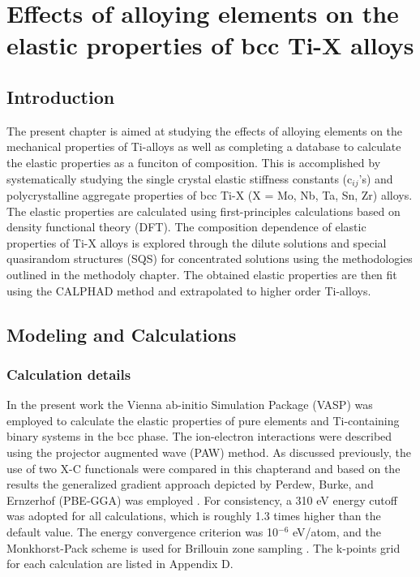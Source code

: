 \chapter{Effects of alloying elements on the elastic properties of bcc Ti-X alloys}

\section{Introduction}

The present chapter is aimed at studying the effects of alloying elements on the mechanical properties of Ti-alloys as well as completing a database to calculate the elastic properties as a funciton of composition. This is accomplished by systematically studying the single crystal elastic stiffness constants (c$_{ij}$'s) and polycrystalline aggregate properties of bcc Ti-X (X = Mo, Nb, Ta, Sn, Zr) alloys. The elastic properties are calculated using first-principles calculations based on density functional theory (DFT). The composition dependence of elastic properties of Ti-X alloys is explored through the dilute solutions and special quasirandom structures (SQS) \cite{Jiang2004} for concentrated solutions using the methodologies outlined in the methodoly chapter. The obtained elastic properties are then fit using the CALPHAD method and extrapolated to higher order Ti-alloys. 

\section{Modeling and Calculations}

\subsection{Calculation details}
In the present work the Vienna ab-initio Simulation Package (VASP) \cite{Kresse1996} was employed to calculate the elastic properties of pure elements and Ti-containing binary systems in the bcc phase. The ion-electron interactions were described using the projector augmented wave (PAW) \cite{Kresse1999,Blochl1994} method. As discussed previously, the use of two X-C functionals were compared in this chapterand and based on the results the generalized gradient approach depicted by Perdew, Burke, and Ernzerhof (PBE-GGA) was employed \cite{Perdew1996a}. For consistency, a 310 eV energy cutoff was adopted for all calculations, which is roughly 1.3 times higher than the default value. The energy convergence criterion was 10$^{-6}$ eV/atom, and the Monkhorst-Pack scheme is used for Brillouin zone sampling \cite{Kresse1996,Monkhorst1976a}. The k-points grid for each calculation are listed in Appendix D.


